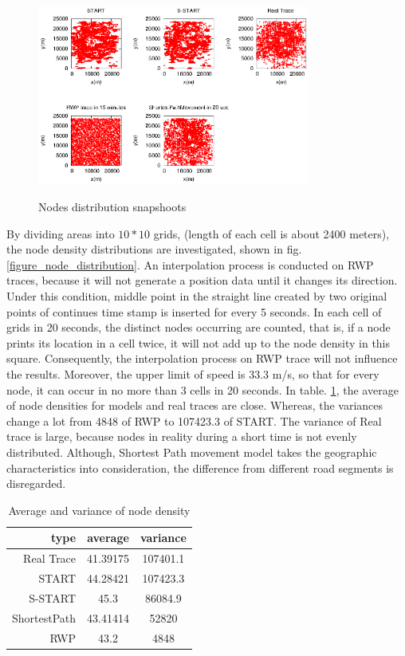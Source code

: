 \begin{figure}[htbp]
\centering
\includegraphics[width=0.8\textwidth]{figures_201103/Evaluation/ev_tracesnapshoots.eps}\\
\caption{Nodes distribution snapshoots}\label{figure_tracesnapshoots}
\end{figure}

By dividing areas into $10*10$ grids, (length of each cell is about 2400 meters), the node density distributions are investigated, shown in fig.\ref{figure_node_distribution}. An interpolation process is conducted on RWP traces, because it will not generate a position data until it changes its direction. Under this condition, middle point in the straight line created by two original points of continues time stamp is inserted for every 5 seconds. In each cell of grids in 20 seconds, the distinct nodes occurring are counted, that is, if a node prints its location in a cell twice, it will not add up to the node density in this square. Consequently, the interpolation process on RWP trace will not influence the results. Moreover, the upper limit of speed is 33.3 m/s, so that for every node, it can occur in no more than 3 cells in 20 seconds.  In table. \ref{figure_avg_var_node_density}, the average of node densities for models and real traces are close. Whereas, the variances change a lot from 4848 of RWP to 107423.3 of START. The variance of Real trace is large, because nodes in reality during a short time is not evenly distributed. Although, Shortest Path movement model takes the geographic characteristics into consideration, the difference from different road segments is disregarded.

\begin{table}
\centering
\caption{Average and variance of node density}\label{figure_avg_var_node_density}
\begin{tabular}{r|c|c}
  \hline
 type & average & variance\\
  \hline
  Real Trace & 41.39175 & 107401.1 \\
  START & 44.28421 & 107423.3 \\
  S-START & 45.3 & 86084.9\\
  ShortestPath & 43.41414 & 52820\\
  RWP & 43.2 & 4848 \\
  \hline
\end{tabular}
\end{table}

